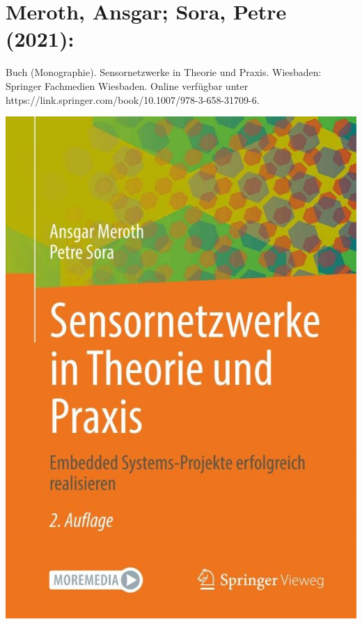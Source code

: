 \section*{Meroth, Ansgar; Sora, Petre (2021):}
Buch (Monographie). Sensornetzwerke in Theorie und Praxis.
Wiesbaden: Springer Fachmedien Wiesbaden. Online verfügbar unter https://link.springer.com/book/10.1007/978-3-658-31709-6.
 \\
\begin{minipage}{0.5\textwidth}
	\includegraphics[width=\linewidth]{../Appendix/Literaturverzeichnis/img/Meroth.jpg}
\end{minipage}
\hfill
